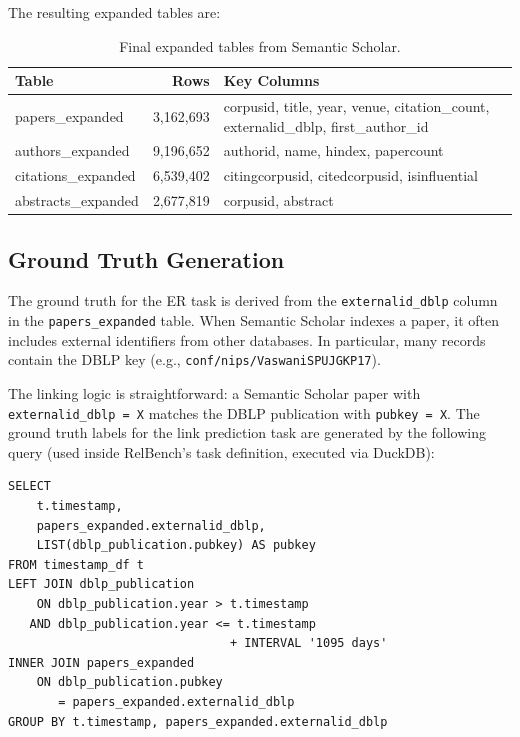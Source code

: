 \documentclass{article}
\begin{document}
The resulting expanded tables are:

\begin{table}[h!]
\centering
\caption{Final expanded tables from Semantic Scholar.}
\label{tab:expanded}
\begin{tabular}{lrp{7cm}}
\toprule
\textbf{Table} & \textbf{Rows} & \textbf{Key Columns} \\
\midrule
papers\_expanded & 3,162,693 & corpusid, title, year, venue, citation\_count, externalid\_dblp, first\_author\_id \\
authors\_expanded & 9,196,652 & authorid, name, hindex, papercount \\
citations\_expanded & 6,539,402 & citingcorpusid, citedcorpusid, isinfluential \\
abstracts\_expanded & 2,677,819 & corpusid, abstract \\
\bottomrule
\end{tabular}
\end{table}


\subsection{Ground Truth Generation}
\label{sec:ground_truth}

The ground truth for the ER task is derived from the \texttt{externalid\_dblp} column in the \texttt{papers\_expanded} table.
When Semantic Scholar indexes a paper, it often includes external identifiers from other databases.
In particular, many records contain the DBLP key (e.g., \texttt{conf/nips/VaswaniSPUJGKP17}).

The linking logic is straightforward: a Semantic Scholar paper with \texttt{externalid\_dblp = X} matches the DBLP publication with \texttt{pubkey = X}.
The ground truth labels for the link prediction task are generated by the following query (used inside RelBench's task definition, executed via DuckDB):

\begin{lstlisting}[caption={Ground truth query for the linkage task.},label={lst:ground_truth}]
SELECT
    t.timestamp,
    papers_expanded.externalid_dblp,
    LIST(dblp_publication.pubkey) AS pubkey
FROM timestamp_df t
LEFT JOIN dblp_publication
    ON dblp_publication.year > t.timestamp
   AND dblp_publication.year <= t.timestamp
                               + INTERVAL '1095 days'
INNER JOIN papers_expanded
    ON dblp_publication.pubkey
       = papers_expanded.externalid_dblp
GROUP BY t.timestamp, papers_expanded.externalid_dblp
\end{lstlisting}
\end{document}
